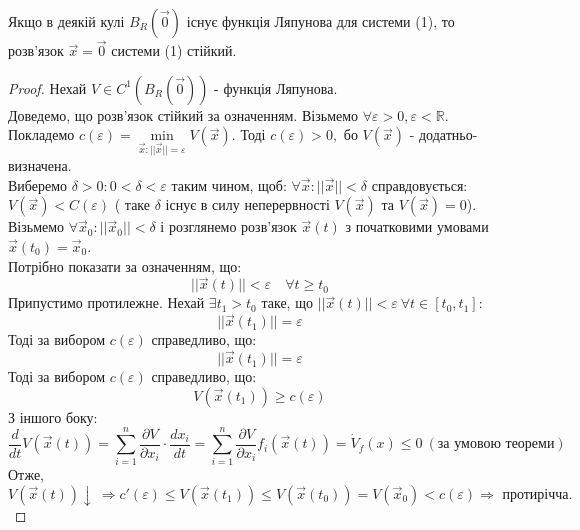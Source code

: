  \begin{boxteo}
   Якщо в деякій кулі $B_{R}( \overrightarrow{0}) $ існує функція Ляпунова для системи (1), то розв'язок $ \overrightarrow{x} = \overrightarrow{0} $ системи (1) стійкий.
 \end{boxteo}
\begin{proof}
 Нехай $ V \in C^{1} ( B_{R} ( \overrightarrow{0} ))$ - функція Ляпунова.\\
 Доведемо, що розв'язок стійкий за означенням.
 Візьмемо $ \forall \varepsilon > 0, \varepsilon < \mathbb{R}$.\\ Покладемо $ c( \varepsilon) = \min\limits_{\overrightarrow{x} : ||\overrightarrow{x}|| = \varepsilon} V(\overrightarrow{x}) $.
 Тоді $ c(\varepsilon) > 0, $ бо $ V( \overrightarrow{x}) $ - додатньо-визначена.\\
 Виберемо $ \delta > 0 : 0 < \delta < \varepsilon $ таким чином, щоб: $ \forall \overrightarrow{x}: ||\overrightarrow{x}|| < \delta $ справдовується:\\
 $V (\overrightarrow{x}) < C(\varepsilon) $ ( таке $\delta$ існує в силу неперервності $V( \overrightarrow{x})$ та $V ( \overrightarrow{x}) =0 $).\\
 Візьмемо $\forall \overrightarrow{x}_0: ||\overrightarrow{x}_0||< \delta $ і розглянемо розв'язок $\overrightarrow{x} (t) $ з початковими умовами $ \overrightarrow{x}(t_0) = \overrightarrow{x}_0$.\\
 Потрібно показати за означенням, що:
 $$
 ||\overrightarrow{x}(t)|| < \varepsilon \quad \forall t \geq t_0
 $$
Припустимо протилежне. Нехай $ \exists t_1 > t_0 $ таке, що $|| \overrightarrow{x}(t) ||< \varepsilon \ \forall t \in [ t_0 , t_1 ]:  $ $$ || \overrightarrow{ x} (t_1) || = \varepsilon$$
Тоді за вибором $c(\varepsilon)$ справедливо, що:
$$
|| \overrightarrow{x} (t_1) || = \varepsilon
$$
Тоді за вибором $ c ( \varepsilon)$ справедливо, що:
$$
V(\overrightarrow{x} (t_1) ) \geq c(\varepsilon)
$$
З іншого боку:
$$
\frac{d}{dt} V(\overrightarrow{x} (t)) =  \sum\limits_{i = 1}^{ n}{ \frac{\partial V}{ \partial x_i } } \cdot \frac{dx_i}{dt} =  \sum\limits_{i = 1}^{n}{ \frac{\partial V}{ \partial x_i } f_i ( \overrightarrow{x} (t))} = \dot{V}_f (x) \leq 0 \  (\text{за умовою теореми})
$$
Отже, $V (\overrightarrow{x}(t))\!\! \downarrow \  \!\Rightarrow\!
c'(\varepsilon) \!\leq\!  V(\overrightarrow{x} (t_1)) \!\leq\! V(\overrightarrow{x} (t_0)) \!=\! V(\overrightarrow{x}_0) \!<\! c(\varepsilon ) \!\Rightarrow\! \text{ протирічча. }
$

\end{proof}


